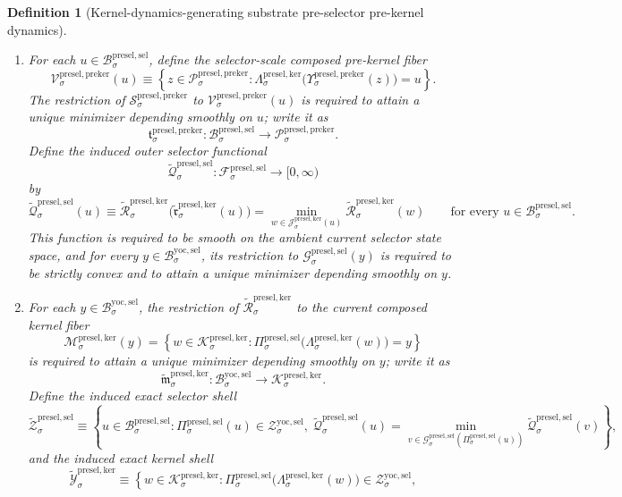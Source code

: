 \documentclass[11pt]{article}
\newcommand{\YoctoSelectorBody}[1]{\mathcal B_{#1}^{\mathrm{yoc,sel}}}
\newcommand{\YoctoSelectorShell}[1]{\mathcal Z_{#1}^{\mathrm{yoc,sel}}}
\newcommand{\PreSectionSelectorSpace}[1]{\mathcal F_{#1}^{\mathrm{presel,sel}}}
\newcommand{\PreSectionSelectorBody}[1]{\mathcal B_{#1}^{\mathrm{presel,sel}}}
\newcommand{\PreSectionSelectorProj}[1]{\Pi_{#1}^{\mathrm{presel,sel}}}
\newcommand{\PreSectionSelectorFiber}[2]{\mathcal G_{#1}^{\mathrm{presel,sel}}(#2)}
\newcommand{\KernelBody}[1]{\mathcal K_{#1}^{\mathrm{presel,ker}}}
\newcommand{\KernelProj}[1]{\Lambda_{#1}^{\mathrm{presel,ker}}}
\newcommand{\KernelFiber}[2]{\mathcal J_{#1}^{\mathrm{presel,ker}}(#2)}
\newcommand{\KernelComposedFiber}[2]{\mathcal M_{#1}^{\mathrm{presel,ker}}(#2)}
\newcommand{\PreKernelBody}[1]{\mathcal P_{#1}^{\mathrm{presel,preker}}}
\newcommand{\PreKernelProj}[1]{\Upsilon_{#1}^{\mathrm{presel,preker}}}
\newcommand{\PreKernelFunctional}[1]{\mathscr S_{#1}^{\mathrm{presel,preker}}}
\newcommand{\PreKernelComposedFiber}[2]{\mathcal V_{#1}^{\mathrm{presel,preker}}(#2)}
\newcommand{\PreKernelComposedMin}[1]{\mathfrak t_{#1}^{\mathrm{presel,preker}}}
\newcommand{\InducedSelectorFunctional}[1]{\widetilde{\mathscr Q}_{#1}^{\mathrm{presel,sel}}}
\newcommand{\InducedSelectorShell}[1]{\widetilde{\mathcal Z}_{#1}^{\mathrm{presel,sel}}}
\newcommand{\InducedKernelFunctional}[1]{\widetilde{\mathscr R}_{#1}^{\mathrm{presel,ker}}}
\newcommand{\InducedKernelMinLift}[1]{\widetilde{\mathfrak r}_{#1}^{\mathrm{presel,ker}}}
\newcommand{\InducedKernelComposedMin}[1]{\widetilde{\mathfrak m}_{#1}^{\mathrm{presel,ker}}}
\newcommand{\InducedKernelShell}[1]{\widetilde{\mathcal Y}_{#1}^{\mathrm{presel,ker}}}
\newtheorem{definition}{Definition}
\begin{document}
\begin{definition}[Kernel-dynamics-generating substrate pre-selector pre-kernel dynamics]
\begin{enumerate}
    \[
    \InducedKernelMinLift{\sigma}:\PreSectionSelectorBody{\sigma}\to\KernelBody{\sigma}.
    \]
    \item For each \(u\in\PreSectionSelectorBody{\sigma}\), define the selector-scale composed pre-kernel fiber
    \[
    \PreKernelComposedFiber{\sigma}{u}
    \equiv
    \left\{
    z\in\PreKernelBody{\sigma}:
    \KernelProj{\sigma}\bigl(\PreKernelProj{\sigma}(z)\bigr)=u
    \right\}.
    \]
    The restriction of \(\PreKernelFunctional{\sigma}\) to \(\PreKernelComposedFiber{\sigma}{u}\) is required to attain a unique minimizer depending smoothly on \(u\); write it as
    \[
    \PreKernelComposedMin{\sigma}:\PreSectionSelectorBody{\sigma}\to\PreKernelBody{\sigma}.
    \]
    Define the induced outer selector functional
    \[
    \InducedSelectorFunctional{\sigma}:\PreSectionSelectorSpace{\sigma}\to[0,\infty)
    \]
    by
    \[
    \InducedSelectorFunctional{\sigma}(u)
    \equiv
    \InducedKernelFunctional{\sigma}\bigl(\InducedKernelMinLift{\sigma}(u)\bigr)
    =
    \min_{w\in\KernelFiber{\sigma}{u}}
    \InducedKernelFunctional{\sigma}(w)
    \qquad
    \text{for every }
    u\in\PreSectionSelectorBody{\sigma}.
    \]
    This function is required to be smooth on the ambient current selector state space, and for every \(y\in\YoctoSelectorBody{\sigma}\), its restriction to \(\PreSectionSelectorFiber{\sigma}{y}\) is required to be strictly convex and to attain a unique minimizer depending smoothly on \(y\).
    \item For each \(y\in\YoctoSelectorBody{\sigma}\), the restriction of \(\InducedKernelFunctional{\sigma}\) to the current composed kernel fiber
    \[
    \KernelComposedFiber{\sigma}{y}
    =
    \left\{
    w\in\KernelBody{\sigma}:
    \PreSectionSelectorProj{\sigma}\bigl(\KernelProj{\sigma}(w)\bigr)=y
    \right\}
    \]
    is required to attain a unique minimizer depending smoothly on \(y\); write it as
    \[
    \InducedKernelComposedMin{\sigma}:\YoctoSelectorBody{\sigma}\to\KernelBody{\sigma}.
    \]
    Define the induced exact selector shell
    \[
    \InducedSelectorShell{\sigma}
    \equiv
    \left\{
    u\in\PreSectionSelectorBody{\sigma}:
    \PreSectionSelectorProj{\sigma}(u)\in\YoctoSelectorShell{\sigma},
    \;
    \InducedSelectorFunctional{\sigma}(u)
    =
    \min_{v\in\PreSectionSelectorFiber{\sigma}{\PreSectionSelectorProj{\sigma}(u)}}
    \InducedSelectorFunctional{\sigma}(v)
    \right\},
    \]
    and the induced exact kernel shell
    \[
    \InducedKernelShell{\sigma}
    \equiv
    \left\{
    w\in\KernelBody{\sigma}:
    \PreSectionSelectorProj{\sigma}\bigl(\KernelProj{\sigma}(w)\bigr)\in\YoctoSelectorShell{\sigma},
\]
\end{enumerate}
\end{definition}
\end{document}
